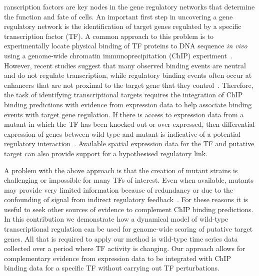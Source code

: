 \documentclass{pnastwo}
\begin{document}
\begin{article}
ranscription factors are key nodes in the gene regulatory
networks that determine the function and fate of
cells. An important first step in uncovering a gene regulatory network
is the identification of target genes regulated by a specific
transcription factor (TF). A
common approach to this problem is to experimentally locate physical binding
of TF proteins to DNA sequence {\em in vivo} using a genome-wide
chromatin immunoprecipitation (ChIP)
experiment~\cite{Ren2000,Iyer2001}. However, recent studies suggest
that many observed binding events are neutral and do not regulate
transcription, while regulatory binding events often occur at
enhancers that are not proximal to the target gene that they
control~\cite{Li2008,MacArthur2009}. Therefore, the task of
identifying transcriptional
targets requires the integration of ChIP binding predictions
with evidence from expression data to help associate binding events
with target gene regulation. If there is access to expression data from a mutant in which the TF has
been knocked out or over-expressed, then differential expression of genes between wild-type
and mutant is indicative of a potential regulatory
interaction~\cite{Furlong2001,Sandmann2006a}. Available spatial expression data for the
TF and putative target can also provide support for a hypothesised
regulatory link. 

A problem with the above approach is that the creation of mutant
strains is challenging or impossible for many TFs of interest. Even
when available, mutants may provide very limited information because of redundancy or due to the
confounding of signal from indirect regulatory feedback~\cite{Gitter2009}. For these reasons it
is useful to seek other sources of evidence to complement ChIP binding
predictions. In this contribution we demonstrate how a dynamical model of wild-type transcriptional
regulation can be used for genome-wide scoring of putative target genes. All that is required to apply
our method is wild-type time series data collected over a period
where TF activity is changing. Our approach allows for complementary
evidence from expression data to be integrated with ChIP binding data
for a specific TF without carrying out TF perturbations. 


\end{article}
\end{document}
